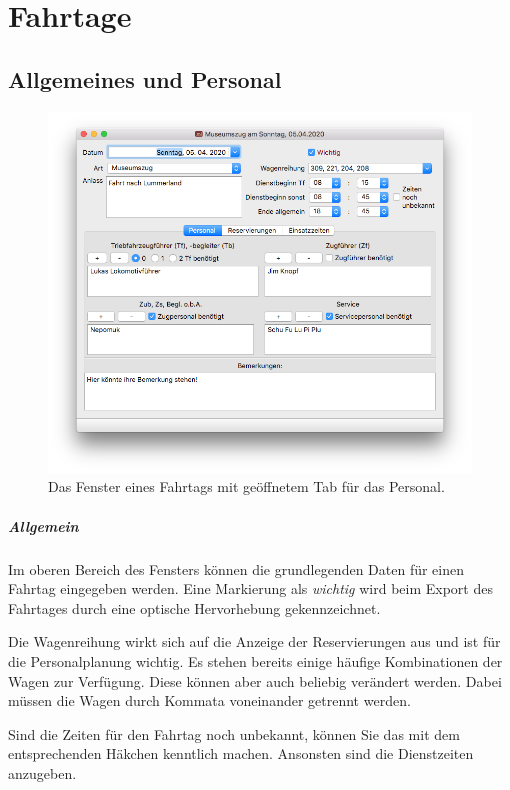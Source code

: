 \chapter{Fahrtage}\label{fahrtag}
\section{Allgemeines und Personal}
\begin{figure}[!h]
	\includegraphics[width=\textwidth]{img/fahrtag_personal}
	\caption{Das Fenster eines Fahrtags mit geöffnetem Tab für das Personal.}
	\label{fig:fahrtag:personal}
\end{figure}
\paragraph{Allgemein}
Im oberen Bereich des Fensters können die grundlegenden Daten für einen Fahrtag eingegeben werden.
Eine Markierung als \emph{wichtig} wird beim Export des Fahrtages durch eine optische Hervorhebung gekennzeichnet.

Die Wagenreihung wirkt sich auf die Anzeige der Reservierungen aus und ist für die Personalplanung wichtig.
Es stehen bereits einige häufige Kombinationen der Wagen zur Verfügung.
Diese können aber auch beliebig verändert werden.
Dabei müssen die Wagen durch Kommata voneinander getrennt werden.

Sind die Zeiten für den Fahrtag noch unbekannt, können Sie das mit dem entsprechenden Häkchen kenntlich machen.
Ansonsten sind die Dienstzeiten anzugeben.

